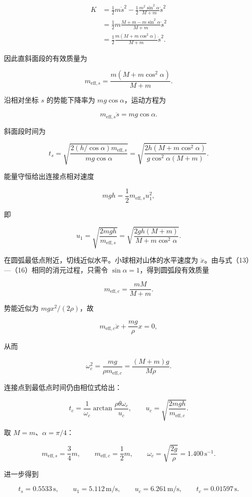 \documentclass[12pt,a4paper,UTF8]{ctexart}
\begin{document}
\[
\begin{aligned}
K
&=\frac12m\dot s^2-\frac12\frac{m^2\sin^2\alpha}{M+m}\dot s^2\\
&=\frac12m\frac{M+m-m\sin^2\alpha}{M+m}\dot s^2\\
&=\frac12\frac{m(M+m\cos^2\alpha)}{M+m}\dot s^2.
\end{aligned} \tag{16}
\]

因此直斜面段的有效质量为

\[
m_{\mathrm{eff},s}=\frac{m(M+m\cos^2\alpha)}{M+m}. \tag{17}
\]

沿相对坐标 \(s\) 的势能下降率为 \(mg\cos\alpha\)，运动方程为

\[
m_{\mathrm{eff},s}\ddot s=mg\cos\alpha. \tag{18}
\]

斜面段时间为

\[
t_s=\sqrt{\frac{2(h/\cos\alpha)m_{\mathrm{eff},s}}{mg\cos\alpha}}
=\sqrt{\frac{2h(M+m\cos^2\alpha)}{g\cos^2\alpha(M+m)}}. \tag{19}
\]

能量守恒给出连接点相对速度

\[
mgh=\frac12m_{\mathrm{eff},s}u_1^2,
\]

即

\[
u_1=\sqrt{\frac{2mgh}{m_{\mathrm{eff},s}}}
=\sqrt{\frac{2gh(M+m)}{M+m\cos^2\alpha}}. \tag{20}
\]

在圆弧最低点附近，切线近似水平。小球相对山体的水平速度为
\(\dot x\)。由与式（13）---（16）相同的消元过程，只需令
\(\sin\alpha=1\)，得到圆弧段有效质量

\[
m_{\mathrm{eff},c}=\frac{mM}{M+m}. \tag{21}
\]

势能近似为 \(mgx^2/(2\rho)\)，故

\[
m_{\mathrm{eff},c}\ddot x+\frac{mg}{\rho}x=0,
\]

从而

\[
\omega_c^2=\frac{mg}{\rho m_{\mathrm{eff},c}}
=\frac{(M+m)g}{M\rho}. \tag{22}
\]

连接点到最低点时间仍由相位式给出：

\[
t_c=\frac1{\omega_c}\arctan\frac{\rho\theta\omega_c}{u_c},\qquad u_c=\sqrt{\frac{2mgh}{m_{\mathrm{eff},c}}}. \tag{23}
\]

取 \(M=m\)、\(\alpha=\pi/4\)：

\[
m_{\mathrm{eff},s}=\frac34m,\qquad
m_{\mathrm{eff},c}=\frac12m,\qquad
\omega_c=\sqrt{\frac{2g}{\rho}}=1.400\,\mathrm{s^{-1}}.
\]

进一步得到

\[
t_s=0.5533\,\mathrm s,\qquad
u_1=5.112\,\mathrm{m/s},\qquad
u_c=6.261\,\mathrm{m/s},\qquad t_c=0.01597\,\mathrm s.
\]
\end{document}

